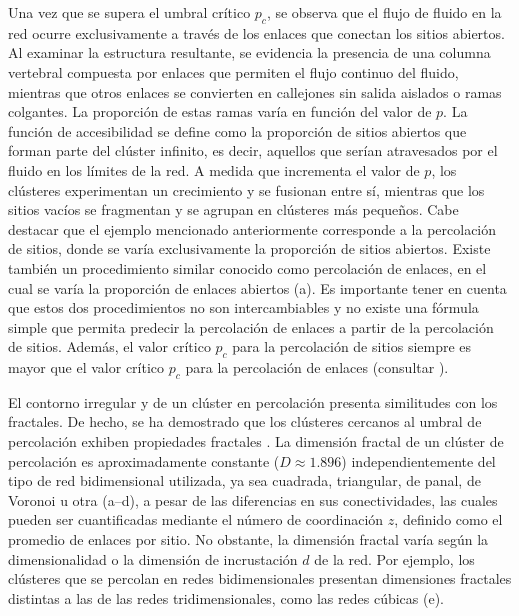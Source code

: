 Una vez que se supera el umbral crítico $p_c$, se observa que el flujo de fluido en la red ocurre exclusivamente a través de los enlaces que conectan los sitios abiertos. Al examinar la estructura resultante, se evidencia la presencia de una columna vertebral compuesta por enlaces que permiten el flujo continuo del fluido, mientras que otros enlaces se convierten en callejones sin salida aislados o ramas colgantes. La proporción de estas ramas varía en función del valor de $p$. La función de accesibilidad se define como la proporción de sitios abiertos que forman parte del clúster infinito, es decir, aquellos que serían atravesados por el fluido en los límites de la red.  A medida que incrementa el valor de $p$, los clústeres experimentan un crecimiento y se fusionan entre sí, mientras que los sitios vacíos se fragmentan y se agrupan en clústeres más pequeños. Cabe destacar que el ejemplo mencionado anteriormente corresponde a la percolación de sitios, donde se varía exclusivamente la proporción de sitios abiertos. Existe también un procedimiento similar conocido como percolación de enlaces, en el cual se varía la proporción de enlaces abiertos (a). Es importante tener en cuenta que estos dos procedimientos no son intercambiables y no existe una fórmula simple que permita predecir la percolación de enlaces a partir de la percolación de sitios. Además, el valor crítico $p_c$ para la percolación de sitios siempre es mayor que el valor crítico $p_c$ para la percolación de enlaces (consultar ).


El contorno irregular y  de un clúster en percolación presenta similitudes con los fractales. De hecho, se ha demostrado que los clústeres cercanos al umbral de percolación exhiben propiedades fractales \cite{aharony_introduction_2017}. La dimensión fractal de un clúster de percolación es aproximadamente constante ($D \approx 1.896$) independientemente del tipo de red bidimensional utilizada, ya sea cuadrada, triangular, de panal, de Voronoi u otra (a–d), a pesar de las diferencias en sus conectividades, las cuales pueden ser cuantificadas mediante el número de coordinación $z$, definido como el promedio de enlaces por sitio. No obstante, la dimensión fractal varía según la dimensionalidad o la dimensión de incrustación $d$ de la red. Por ejemplo, los clústeres que se percolan en redes bidimensionales presentan dimensiones fractales distintas a las de las redes tridimensionales, como las redes cúbicas (e).



